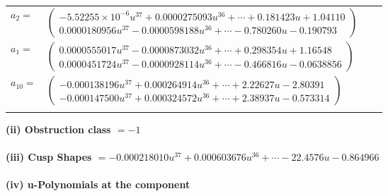 \documentclass[1p]{elsarticle_modified}
\theoremstyle{definition}
\begin{document}
\begin{tabular}{m{7pt} m{180pt} m{7pt} m{180pt} }
\flushright $a_{2}=$&$\begin{pmatrix}-5.52255\times10^{-6} u^{37}+0.0000275093 u^{36}+\cdots+0.181423 u+1.04110\\0.0000180956 u^{37}-0.0000598188 u^{36}+\cdots-0.780260 u-0.190793\end{pmatrix}$ \\
\flushright $a_{1}=$&$\begin{pmatrix}0.0000555017 u^{37}-0.0000873032 u^{36}+\cdots+0.298354 u+1.16548\\0.0000451724 u^{37}-0.0000928114 u^{36}+\cdots-0.466816 u-0.0638856\end{pmatrix}$ \\
\flushright $a_{10}=$&$\begin{pmatrix}-0.000138196 u^{37}+0.000264914 u^{36}+\cdots+2.22627 u-2.80391\\-0.000147500 u^{37}+0.000324572 u^{36}+\cdots+2.38937 u-0.573314\end{pmatrix}$\\&\end{tabular}
\flushleft \textbf{(ii) Obstruction class $= -1$}\\~\\
\flushleft \textbf{(iii) Cusp Shapes $= -0.000218010 u^{37}+0.000603676 u^{36}+\cdots-22.4576 u-0.864966$}\\~\\
\newpage\renewcommand{\arraystretch}{1}
\flushleft \textbf{(iv) u-Polynomials at the component}\newline \\
\end{document}
